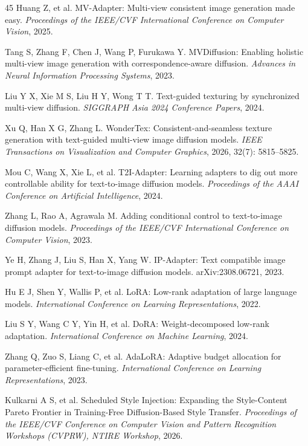 \documentclass[times,twocolumn,final]{elsarticle}
\begin{document}
\begin{thebibliography}{45}
Huang Z, et al. MV-Adapter: Multi-view consistent image generation made easy. \textit{Proceedings of the IEEE/CVF International Conference on Computer Vision}, 2025.

Tang S, Zhang F, Chen J, Wang P, Furukawa Y. MVDiffusion: Enabling holistic multi-view image generation with correspondence-aware diffusion. \textit{Advances in Neural Information Processing Systems}, 2023.

Liu Y X, Xie M S, Liu H Y, Wong T T. Text-guided texturing by synchronized multi-view diffusion. \textit{SIGGRAPH Asia 2024 Conference Papers}, 2024.

Xu Q, Han X G, Zhang L. WonderTex: Consistent-and-seamless texture generation with text-guided multi-view image diffusion models. \textit{IEEE Transactions on Visualization and Computer Graphics}, 2026, 32(7): 5815--5825.

Mou C, Wang X, Xie L, et al. T2I-Adapter: Learning adapters to dig out more controllable ability for text-to-image diffusion models. \textit{Proceedings of the AAAI Conference on Artificial Intelligence}, 2024.

Zhang L, Rao A, Agrawala M. Adding conditional control to text-to-image diffusion models. \textit{Proceedings of the IEEE/CVF International Conference on Computer Vision}, 2023.

Ye H, Zhang J, Liu S, Han X, Yang W. IP-Adapter: Text compatible image prompt adapter for text-to-image diffusion models. arXiv:2308.06721, 2023.

Hu E J, Shen Y, Wallis P, et al. LoRA: Low-rank adaptation of large language models. \textit{International Conference on Learning Representations}, 2022.

Liu S Y, Wang C Y, Yin H, et al. DoRA: Weight-decomposed low-rank adaptation. \textit{International Conference on Machine Learning}, 2024.

Zhang Q, Zuo S, Liang C, et al. AdaLoRA: Adaptive budget allocation for parameter-efficient fine-tuning. \textit{International Conference on Learning Representations}, 2023.

Kulkarni A S, et al. Scheduled Style Injection: Expanding the Style-Content Pareto Frontier in Training-Free Diffusion-Based Style Transfer. \textit{Proceedings of the IEEE/CVF Conference on Computer Vision and Pattern Recognition Workshops (CVPRW), NTIRE Workshop}, 2026.


\end{thebibliography}
\end{document}
